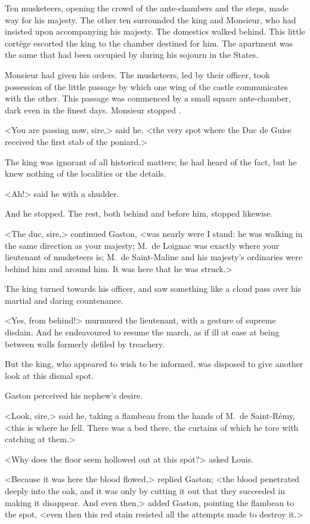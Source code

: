 Ten musketeers, opening the crowd of the ante-chambers and the steps, made way for his majesty. The other ten surrounded the king and Monsieur, who had insisted upon accompanying his majesty. The domestics walked behind. This little cortège escorted the king to the chamber destined for him. The apartment was the same that had been occupied by  during his sojourn in the States.

Monsieur had given his orders. The musketeers, led by their officer, took possession of the little passage by which one wing of the castle communicates with the other. This passage was commenced by a small square ante-chamber, dark even in the finest days. Monsieur stopped .

<You are passing now, sire,> said he, <the very spot where the Duc de Guise received the first stab of the poniard.>

The king was ignorant of all historical matters; he had heard of the fact, but he knew nothing of the localities or the details.

<Ah!> said he with a shudder.

And he stopped. The rest, both behind and before him, stopped likewise.

<The duc, sire,> continued Gaston, <was nearly were I stand: he was walking in the same direction as your majesty; M.~de Loignac was exactly where your lieutenant of musketeers is; M.~de Saint-Maline and his majesty's ordinaries were behind him and around him. It was here that he was struck.>

The king turned towards his officer, and saw something like a cloud pass over his martial and daring countenance.

<Yes, from behind!> murmured the lieutenant, with a gesture of supreme disdain. And he endeavoured to resume the march, as if ill at ease at being between walls formerly defiled by treachery.

But the king, who appeared to wish to be informed, was disposed to give another look at this dismal spot.

Gaston perceived his nephew's desire.

<Look, sire,> said he, taking a flambeau from the hands of M.~de Saint-Rémy, <this is where he fell. There was a bed there, the curtains of which he tore with catching at them.>

<Why does the floor seem hollowed out at this spot?> asked Louis.

<Because it was here the blood flowed,> replied Gaston; <the blood penetrated deeply into the oak, and it was only by cutting it out that they succeeded in making it disappear. And even then,> added Gaston, pointing the flambeau to the spot, <even then this red stain resisted all the attempts made to destroy it.>

